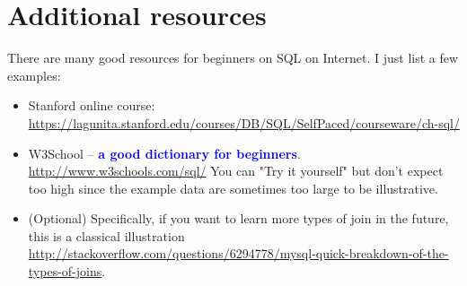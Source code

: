 \documentclass[12pt]{article}
\newcommand{\tblue}[1]{\textcolor{blue}{#1}}
\begin{document}
\section{Additional resources}
There are many good resources for beginners on SQL on Internet. I just list a few examples:
\begin{itemize}
	\item Stanford online course: \url{https://lagunita.stanford.edu/courses/DB/SQL/SelfPaced/courseware/ch-sql/}
	\item W3School -- \tblue{\bf a good dictionary for beginners}. \url{http://www.w3schools.com/sql/} You can "Try it yourself" but don't expect too high since the example data are sometimes too large to be illustrative.
	\item (Optional) Specifically, if you want to learn more types of join in the future, this is a classical illustration\\ \url{http://stackoverflow.com/questions/6294778/mysql-quick-breakdown-of-the-types-of-joins}.
\end{itemize}
\end{document}
